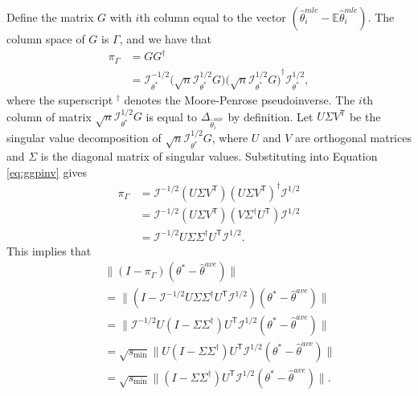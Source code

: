\documentclass[twoside]{article}
\newcommand{\smin}{s_\text{min}}
\newcommand{\matW}{\hat W}
\newcommand{\matV}{\hat V}
\newcommand{\W}{{\hat \Theta^{\textit{owa}}}}
\newcommand{\E}{\mathbb{E}}
\newcommand{\w}{\theta}
\newcommand{\wave}{\hat\w^{ave}}
\newcommand{\wmle}{\hat\w^{mle}}
\newcommand{\wstar}{{\w^{*}}}
\newcommand{\I}{\mathcal I}
\newcommand{\trans}[1]{\ensuremath{{#1}^{\mathsf{T}}}}
\newcommand{\pinv}[1]{\ensuremath{{#1}^{\mathsf{\dagger}}}}
\newcommand{\ltwo}[1]{{\lVert {#1} \rVert}}
\newcommand{\proj}[1]{\pi_{{#1}}}
\begin{document}
Define the matrix $G$ with $i$th column equal to the vector $(\wmle_i-\E\wmle_i)$.
The column space of $G$ is $\Gamma$,
and we have that
\begin{align}
\proj\Gamma
&=
G\pinv G
\\
&= \I_\wstar^{-1/2}\bigg(\sqrt{n}\I_\wstar^{1/2}G\bigg)
             \pinv{\bigg(\sqrt{n}\I_\wstar^{1/2}G\bigg)}
   \I_\wstar^{1/2}
,
\label{eq:ggpinv}
\end{align}
where the superscript $\pinv{}$ denotes the Moore-Penrose pseudoinverse.
The $i$th column of matrix $\sqrt{n}\I^{1/2}_{\wstar}G$ is equal to $\Delta_{\wmle_i}$ by definition.
%
Let $U\Sigma \trans V$ be the singular value decomposition of $\sqrt{n}\I^{1/2}_{\wstar}G$,
where $U$ and $V$ are orthogonal matrices and $\Sigma$ is the diagonal matrix of singular values.
Substituting into Equation \ref{eq:ggpinv} gives
\begin{align}
\proj\Gamma
&= \I^{-1/2} (U\Sigma \trans V)\pinv{(U \Sigma \trans V)} \I^{1/2}
\\
&= \I^{-1/2} (U\Sigma \trans V)(V \pinv\Sigma \trans U) \I^{1/2}
\\
&= \I^{-1/2} U\Sigma \pinv\Sigma \trans U \I^{1/2}
.
\label{eq:vvp2}
\end{align}
This implies that
\begin{align}
~~~~~&\!\!\!\!\!\!\!\!\!\!\!\ltwo{(I-\proj\Gamma)(\wstar-\wave)}
\nonumber
\\
&=
\ltwo{(I-\I^{-1/2} U\Sigma \pinv\Sigma \trans U \I^{1/2})(\wstar - \wave)}
\\
&=
\ltwo{\I^{-1/2} U(I-\Sigma \pinv\Sigma )\trans U \I^{1/2}(\wstar - \wave)}
\\
&=
\sqrt{\smin}\ltwo{U(I-\Sigma \pinv\Sigma )\trans U \I^{1/2}(\wstar - \wave)}
\label{eq:fromdefsmin}
\\
&=
\sqrt{\smin}\ltwo{(I-\Sigma \pinv\Sigma )\trans U \I^{1/2}(\wstar - \wave)}
\label{eq:fromrotinvl2}
.
\end{align}
\end{document}
